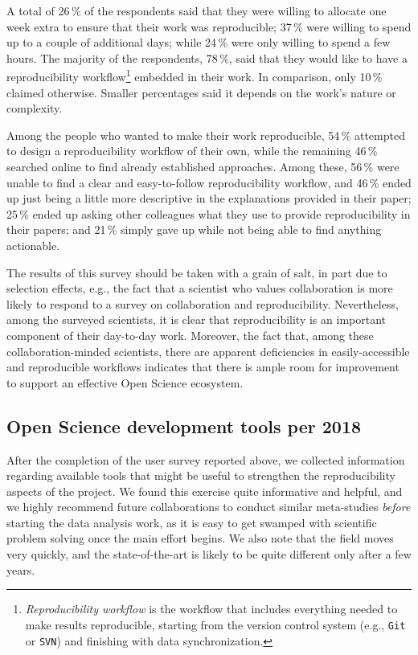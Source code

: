 \documentclass[twocolumn]{aa}
\begin{document}
A total of 26\,\% of the respondents said that they were willing to allocate one week extra to ensure that their work was reproducible; 37\,\% were willing to spend up to a couple of additional days; while 24\,\% were only willing to spend a few hours. The majority of the respondents, 78\,\%, said that they would like to have a reproducibility workflow\footnote{\textit{Reproducibility workflow} is the workflow that includes everything needed to make results reproducible,  starting from the version control system (e.g., \texttt{Git} or \texttt{SVN}) and finishing with data synchronization.}  embedded in their work. In comparison, only 10\,\% claimed otherwise. Smaller percentages said it depends on the work's nature or complexity.

Among the people who wanted to make their work reproducible, 54\,\% attempted to design a reproducibility workflow of their own, while the remaining 46\,\% searched online to find already established approaches. Among these, 56\,\% were unable to find a clear and easy-to-follow reproducibility workflow, and 46\,\% ended up just being a little more descriptive in the explanations provided in their paper; 25\,\% ended up asking other colleagues what they use to provide reproducibility in their papers; and 21\,\% simply gave up while not being able to find anything actionable.


The results of this survey should be taken with a grain of salt, in part due to selection effects, e.g., the fact that a scientist who values collaboration is more likely to respond to a survey on collaboration and reproducibility. Nevertheless, among the surveyed scientists, it is clear that reproducibility is an important component of their day-to-day work. Moreover, the fact that, among these collaboration-minded scientists, there are apparent deficiencies in easily-accessible and reproducible workflows indicates that there is ample room for improvement to support an effective Open Science ecosystem.


\subsection{Open Science development tools per 2018}

After the completion of the user survey reported above, we collected information regarding available tools that might be useful to strengthen the reproducibility aspects of the project. We found this exercise quite informative and helpful, and we highly recommend future collaborations to conduct similar meta-studies \emph{before} starting the data analysis work, as it is easy to get swamped with scientific problem solving once the main effort begins. We also note that the field moves very quickly, and the state-of-the-art is likely to be quite different only after a few years.
\end{document}
